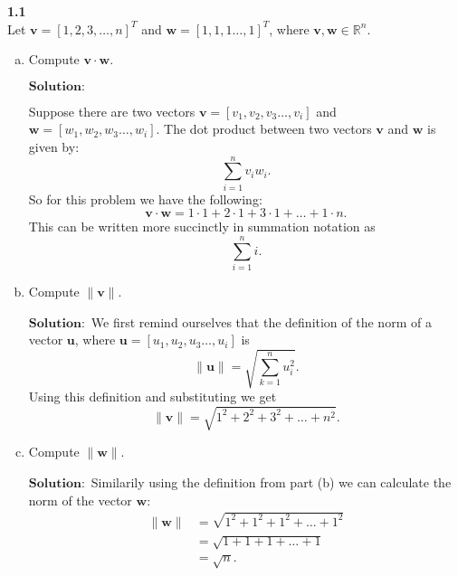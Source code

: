 \documentclass[12pt]{article}
\begin{document}
    
    \textbf{1.1} \\  
    
        Let $\mathbf{v} = [1,2,3,\dots ,n]^T$ and $\mathbf{w} = [1,1,1\dots,1]^T$, where $\mathbf{v},\mathbf{w} \in \mathbb{R}^n$.
    
    
    \begin{enumerate}[(a)]
        \item Compute $\mathbf{v} \cdot \mathbf{w}$.
            
            $\textbf{Solution}:$
            
            Suppose there are two vectors $\textbf{v} = [v_1, v_2, v_3 \dots, v_i]$ and $\textbf{w} = [w_1, w_2, w_3 \dots ,w_i].$ 
             The dot product between two vectors $\textbf{v}$ and $\textbf{w}$ is given by:\[
              \sum_{i=1}^n v_iw_i  
            .\]
            So for this problem we have the following:
            \[
            \mathbf{v} \cdot \mathbf{w} = 1\cdot1 + 2 \cdot 1 + 3 \cdot 1 + \dots + 1 \cdot n
            .\]
            This can be written more succinctly in summation notation as
            \[
            \sum_{i=1}^n i
            .\]
        \item Compute $\|\mathbf{v}\|$.        
        
            $\textbf{Solution}:$ We first remind ourselves that the definition of the norm of a vector $\mathbf{u}$, where $\textbf{u} = [u_1, u_2, u_3 \dots, u_i]$ is \[
                \|  \mathbf{u} \| = \sqrt{\sum_{k=1}^{n}u_i^2}
            .\]
            Using this definition and substituting we get\[
                \|  \mathbf{v} \| = \sqrt{1^2 + 2^2 + 3^2 + \dots +n^2}
            .\]
        \item Compute $\|\mathbf{w}\|$.
                
        $\textbf{Solution}:$ Similarily using the definition from part (b) we can calculate the norm of the vector $\mathbf{w}$:
        \begin{align*}
            \|  \mathbf{w} \|& = \sqrt{1^2 + 1^2 + 1^2 + \dots +1^2}\\
            & = \sqrt{1 + 1 + 1 + \dots +1}\\
            & = \sqrt{n}
        .\end{align*}
       
    \end{enumerate}
\end{document}
